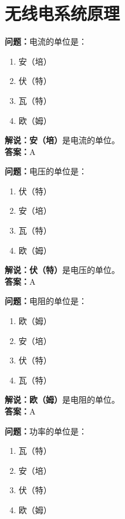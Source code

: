 \chapter{无线电系统原理}


\textbf{问题：}电流的单位是：

\begin{enumerate}[label=\Alph*), leftmargin=1cm]
	\item 安（培）
	\item 伏（特）
	\item 瓦（特）
	\item 欧（姆）
\end{enumerate}

\textbf{解说：}\textbf{安（培）}是电流的单位。\\\textbf{答案：}A



\textbf{问题：}电压的单位是：

\begin{enumerate}[label=\Alph*), leftmargin=1cm]
	\item 伏（特）
	\item 安（培）
	\item 瓦（特）
	\item 欧（姆）
\end{enumerate}

\textbf{解说：伏（特）}是电压的单位。\\\textbf{答案：}A



\textbf{问题：}电阻的单位是：

\begin{enumerate}[label=\Alph*), leftmargin=1cm]
	\item 欧（姆）
	\item 安（培）
	\item 伏（特）
	\item 瓦（特）
\end{enumerate}

\textbf{解说：欧（姆）}是电阻的单位。\\\textbf{答案：}A



\textbf{问题：}功率的单位是：

\begin{enumerate}[label=\Alph*), leftmargin=1cm]
	\item 瓦（特）
	\item 安（培）
	\item 伏（特）
	\item 欧（姆）
\end{enumerate}

